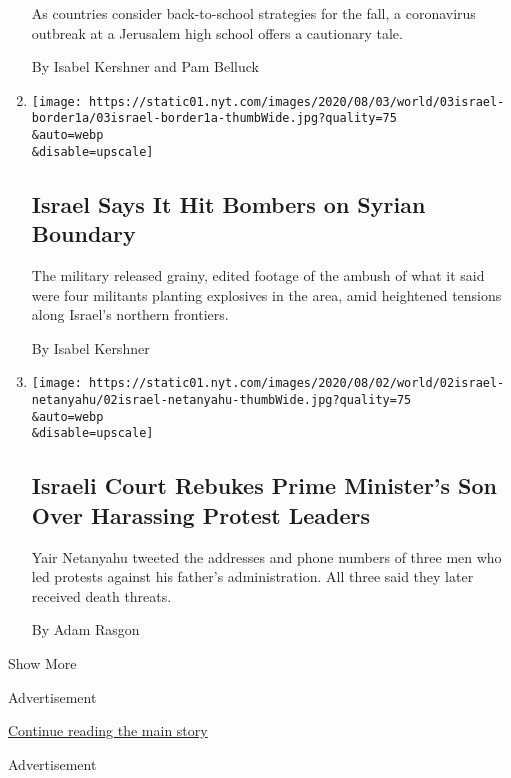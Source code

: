 \begin{enumerate}
  As countries consider back-to-school strategies for the fall, a
  coronavirus outbreak at a Jerusalem high school offers a cautionary
  tale.

  By Isabel Kershner and Pam Belluck
\item
  \href{/2020/08/03/world/middleeast/israel-syria-border.html}{}

  \texttt{[image: https://static01.nyt.com/images/2020/08/03/world/03israel-border1a/03israel-border1a-thumbWide.jpg?quality=75\\\&auto=webp\\\&disable=upscale]}

  \hypertarget{israel-says-it-hit-bombers-on-syrian-boundary}{%
  \subsection{Israel Says It Hit Bombers on Syrian
  Boundary}\label{israel-says-it-hit-bombers-on-syrian-boundary}}

  The military released grainy, edited footage of the ambush of what it
  said were four militants planting explosives in the area, amid
  heightened tensions along Israel's northern frontiers.

  By Isabel Kershner
\item
  \href{/2020/08/02/world/middleeast/israel-Netanyahus-son-tweets.html}{}

  \texttt{[image: https://static01.nyt.com/images/2020/08/02/world/02israel-netanyahu/02israel-netanyahu-thumbWide.jpg?quality=75\\\&auto=webp\\\&disable=upscale]}

  \hypertarget{israeli-court-rebukes-prime-ministers-son-over-harassing-protest-leaders}{%
  \subsection{Israeli Court Rebukes Prime Minister's Son Over Harassing
  Protest
  Leaders}\label{israeli-court-rebukes-prime-ministers-son-over-harassing-protest-leaders}}

  Yair Netanyahu tweeted the addresses and phone numbers of three men
  who led protests against his father's administration. All three said
  they later received death threats.

  By Adam Rasgon
\end{enumerate}

Show More

Advertisement

\protect\hyperlink{after-mid1}{Continue reading the main story}

Advertisement


